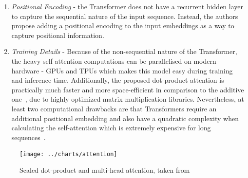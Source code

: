 \begin{enumerate}
\begin{itemize}
        \begin{equation}\label{eq:attention}
            \text{Attention}(Q, K, V) = \text{softmax}\left(\frac{QK^T}{\sqrt{d_k}}\right)V
        \end{equation}

        \item \emph{The multi-head attention}~\cite{vaswani2017attention} is a mechanism that allows the Transformer to learn multiple representations of the input sequence.
        This is achieved by stacking multiple attention heads (each with its own $Q$, $K$, $V$ matrices) and concatenating their outputs (Figure~\ref{fig:attention_dot_product}).
        For each head $h_i$, the $Q$, $K$, and $V$ vectors will be linearly projected with different weight matrices $W_i^Q$, $W_i^K$, and $W_i^V$, respectively.
        The intuition is that each attention head learns different aspects of the relationships that exist among inputs (e.g., syntactic, semantic, and discourse relationships~\cite{jurafsky2000}) and the concatenation of the different representations allows the Transformer to learn a richer overall representation of the input sequence.

    \end{itemize}
    \item \emph{Positional Encoding} - the Transformer does not have a recurrent hidden layer to capture the sequential nature of the input sequence.
    Instead, the authors~\cite{vaswani2017attention} propose adding a positional encoding to the input embeddings as a way to capture positional information.
    \item \emph{Training Details} - Because of the non-sequential nature of the Transformer, the heavy self-attention computations can be parallelised on modern hardware - GPUs and TPUs which makes this model easy during training and inference time.
    Additionally, the proposed dot-product attention is practically much faster and more space-efficient in comparison to the additive one~\cite{bahdanau2016neural}, due to highly optimized matrix multiplication libraries.
    Nevertheless, at least two computational drawbacks are that Transformers require an additional positional embedding and also have a quadratic complexity when calculating the self-attention which is extremely expensive for long sequences~\cite{jurafsky2000}.
\end{enumerate}

\begin{figure}[ht]
    \centering
    \texttt{[image: ../charts/attention]}~\caption{Scaled dot-product and multi-head attention, taken from \cite{vaswani2017attention}}
    \label{fig:attention_dot_product}
\end{figure}

